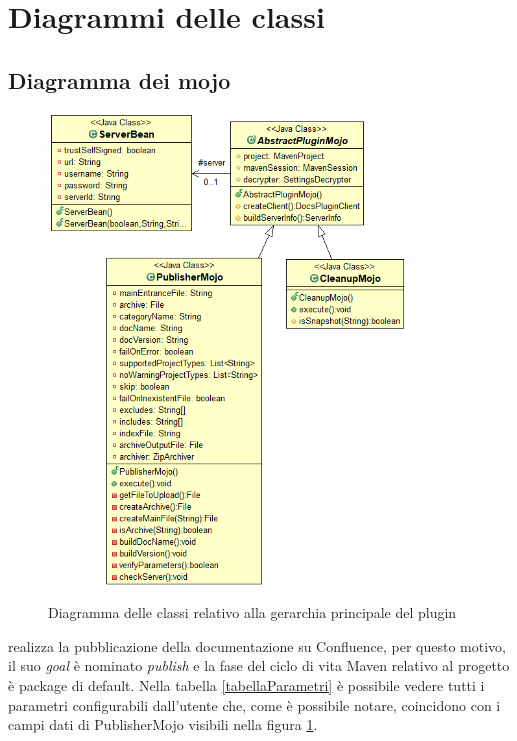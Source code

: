 \clearpage


\section{Diagrammi delle classi}
\label{sec:diagrammi-classi}

\subsection{Diagramma dei mojo} \label{diagrammiMojo}

\begin{figure}[H]
    \centering
    \includegraphics[width=0.85\textwidth]{immagini/mojo-gerarchy.png}\\
    \caption{Diagramma delle classi relativo alla gerarchia principale del plugin}
    \label{diagrammaMojo}
\end{figure}

 realizza la pubblicazione della documentazione su Confluence, per questo motivo, il suo \emph{goal} è nominato \emph{publish} e la fase del ciclo di vita Maven relativo al progetto è package di default.
Nella tabella \ref{tabellaParametri} è possibile vedere tutti i parametri configurabili dall'utente che, come è possibile notare, coincidono con i campi dati di PublisherMojo visibili nella figura \ref{diagrammaMojo}.

